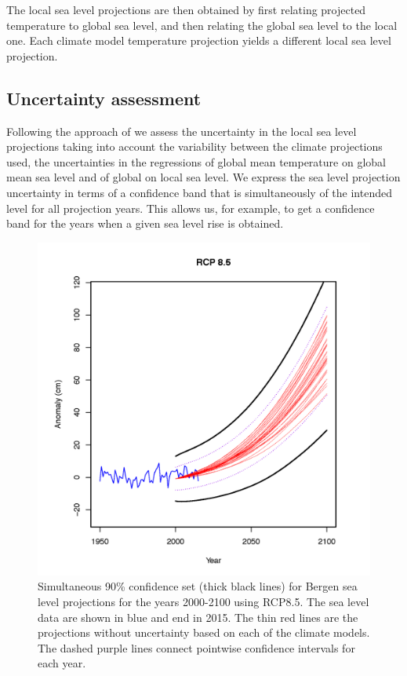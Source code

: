 \documentclass[wrr, draft]{agutex}
\begin{document}
\begin{article}
The local sea level projections are then obtained by first relating projected temperature to global sea level, and then relating the global sea level to the local one. Each climate model temperature projection yields a different local sea level projection.

\subsection{Uncertainty assessment}
\label{unc_ass}
Following the approach of \citet{Guttorp2014} we assess the uncertainty in the local sea level projections taking into account the variability between the climate projections used, the uncertainties in the regressions of global mean temperature on global mean sea level and of global on local sea level. We express the sea level projection uncertainty in terms of a confidence band that is simultaneously of the intended  level  for all projection years. This allows us, for example, to get a confidence band for the years when a given sea level rise is obtained.

\begin{figure}
\begin{center}
\includegraphics[width=39pc]{bergen_ci.png}
\caption{Simultaneous 90\% confidence set (thick black lines) for Bergen sea level projections for the years 2000-2100 using RCP8.5. The sea level data are shown in blue and end in 2015. The thin red lines are the projections without uncertainty based on each of the climate models. The dashed purple lines connect pointwise confidence intervals for each year. }
\label{fig:ci}
\end{center}
\end{figure}



\end{article}
\end{document}
